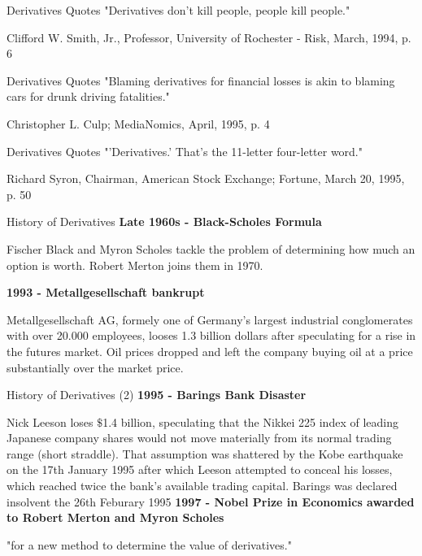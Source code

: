 {Derivatives Quotes}
"Derivatives don't kill people, people kill people."
\begin{flushright}
  \begin{footnotesize}
 Clifford W. Smith, Jr., Professor, University of Rochester - Risk, March, 1994, p. 6
 \end{footnotesize}
\end{flushright}

{Derivatives Quotes}
"Blaming derivatives for financial losses is akin to blaming cars for drunk driving fatalities."
\begin{flushright}
  \begin{footnotesize}
 Christopher L. Culp; MediaNomics, April, 1995, p. 4
 \end{footnotesize}
\end{flushright}

{Derivatives Quotes}
"'Derivatives.' That's the 11-letter four-letter word."
\begin{flushright}
  \begin{footnotesize}
  Richard Syron, Chairman, American Stock Exchange; Fortune, March 20, 1995, p. 50
 \end{footnotesize}
\end{flushright}

{History of Derivatives}
\textbf{Late 1960s - Black-Scholes Formula}\\
  \item Fischer Black and Myron Scholes tackle the problem of determining how much an option is worth. Robert Merton joins them in 1970.

\textbf{1993 - Metallgesellschaft bankrupt}
  \item Metallgesellschaft AG, formely one of Germany's largest industrial conglomerates with over 20.000 employees, looses 1.3 billion dollars after speculating for a rise in the futures market. Oil prices dropped and left the company buying oil at a price substantially over the market price.

{History of Derivatives (2)}
\textbf{1995 - Barings Bank Disaster }
  \item Nick Leeson loses $\$$1.4 billion, speculating that the Nikkei 225 index of leading Japanese company shares would not move materially from its normal trading range (short straddle). That assumption was shattered by the Kobe earthquake on the 17th January 1995 after which Leeson attempted to conceal his losses, which reached twice the bank's available trading capital. Barings was declared insolvent the 26th Feburary 1995
\textbf{1997 - Nobel Prize in Economics awarded to Robert Merton and Myron Scholes}
  \item "for a new method to determine the value of derivatives."

